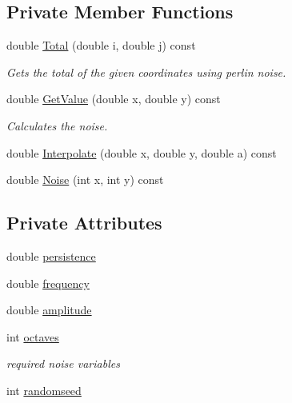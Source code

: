 \subsection*{Private Member Functions}
\begin{DoxyCompactItemize}
\item 
double \mbox{\hyperlink{class_perlin_noise_a63d0a127952107e5628c428c8a234de8}{Total}} (double i, double j) const
\begin{DoxyCompactList}\small\item\em Gets the total of the given coordinates using perlin noise. \end{DoxyCompactList}\item 
double \mbox{\hyperlink{class_perlin_noise_aa62e61ba1a73bdeff0901e95f656a806}{Get\+Value}} (double x, double y) const
\begin{DoxyCompactList}\small\item\em Calculates the noise. \end{DoxyCompactList}\item 
double \mbox{\hyperlink{class_perlin_noise_ac4a0870388edd44e14caca983bd018aa}{Interpolate}} (double x, double y, double a) const
\item 
double \mbox{\hyperlink{class_perlin_noise_a40cedf54fffebae57229216cd1b2c880}{Noise}} (int x, int y) const
\end{DoxyCompactItemize}
\subsection*{Private Attributes}
\begin{DoxyCompactItemize}
\item 
double \mbox{\hyperlink{class_perlin_noise_aeb01e2c26e1b3c87fcbe1a1e0bc28881}{persistence}}
\item 
double \mbox{\hyperlink{class_perlin_noise_a5e0b39e0cf38d292f0c92a428ecc56fc}{frequency}}
\item 
double \mbox{\hyperlink{class_perlin_noise_a61323596df1daa4a56f057a43f9c12ba}{amplitude}}
\item 
int \mbox{\hyperlink{class_perlin_noise_a1098ffa60dc53802b509e57e6d96c072}{octaves}}
\begin{DoxyCompactList}\small\item\em required noise variables \end{DoxyCompactList}\item 
int \mbox{\hyperlink{class_perlin_noise_a012846debd95e4cc158600fa381810d9}{randomseed}}
\end{DoxyCompactItemize}


